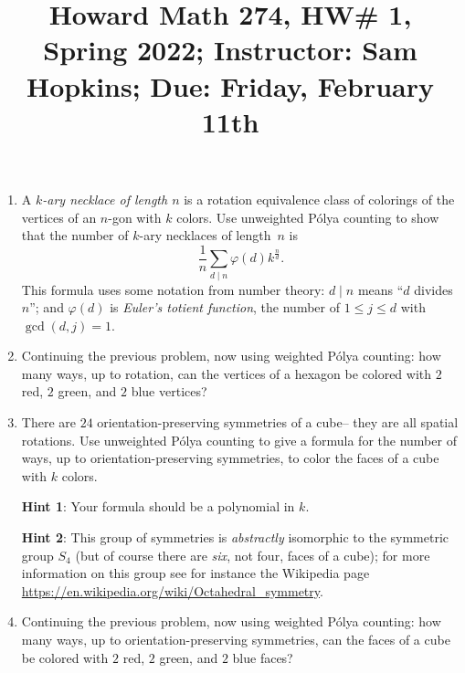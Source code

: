 \documentclass[11pt]{article}
\title{Howard Math 274, HW\# 1, \\ {\normalsize Spring 2022; Instructor: Sam Hopkins; Due: Friday, February 11th}}
\date{}
\begin{document}
\maketitle

\thispagestyle{empty}

\vspace{-1.5cm}

\begin{enumerate}

\item A \emph{$k$-ary necklace of length $n$} is a rotation equivalence class of colorings of the vertices of an $n$-gon with $k$ colors. Use unweighted P\'{o}lya counting to show that the number of $k$-ary necklaces of length~$n$ is
\[ \frac{1}{n}\sum_{d\mid n} \varphi(d) k^{\frac{n}{d}}.\]
This formula uses some notation from number theory: $d \mid n$ means ``$d$ divides $n$''; and $\varphi(d)$ is \emph{Euler's totient function}, the number of $1 \leq j \leq d$ with $\gcd(d,j)=1$.

\item Continuing the previous problem, now using weighted P\'{o}lya counting: how many ways, up to rotation, can the vertices of a hexagon be colored with $2$ red, $2$ green, and $2$ blue vertices?

\item There are $24$ orientation-preserving symmetries of a cube-- they are all spatial rotations. Use unweighted P\'{o}lya counting to give a formula for the number of ways, up to orientation-preserving symmetries, to color the faces of a cube with $k$ colors. 

{\bf Hint 1}: Your formula should be a polynomial in $k$.

{\bf Hint 2}: This group of symmetries is \emph{abstractly} isomorphic to the symmetric group $S_4$ (but of course there are \emph{six}, not four, faces of a cube); for more information on this group see for instance the Wikipedia page \url{https://en.wikipedia.org/wiki/Octahedral_symmetry}.

\item Continuing the previous problem, now using weighted P\'{o}lya counting: how many ways, up to orientation-preserving symmetries, can the faces of a cube be colored with $2$ red, $2$ green, and $2$ blue faces?


\end{enumerate}
\end{document}
